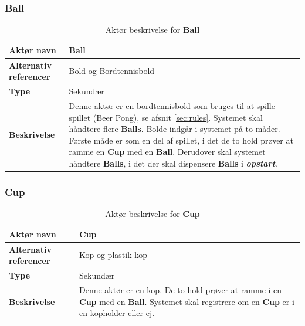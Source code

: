 \documentclass[Kravspecifikation/Kravspec_Main.tex]{subfiles}
\begin{document}
\subsubsection{Ball}
\begin{table}[H]
    \centering
    \begin{tabular}{|L{0.35\textwidth}|L{0.65\textwidth}|}
        \hline
        \textbf{Aktør navn} & Ball \\ \hline
        \textbf{Alternativ referencer} & Bold og Bordtennisbold \\ \hline
        \textbf{Type} & Sekundær \\ \hline
        \textbf{Beskrivelse} & Denne aktør er en bordtennisbold som bruges til at spille spillet (Beer Pong), se afsnit \ref{sec:rules}. Systemet skal håndtere flere \textbf{Balls}. Bolde indgår i systemet på to måder. Første måde er som en del af spillet, i det de to hold prøver at ramme en \textbf{Cup} med en \textbf{Ball}. Derudover skal systemet håndtere \textbf{Balls}, i det der skal dispensere \textbf{Balls} i \textbf{\textit{opstart}}.\\ \hline
    \end{tabular}
    \caption{Aktør beskrivelse for \textbf{Ball}}
    \label{tab:BallBeskrivelse}
\end{table}

\subsubsection{Cup}
\begin{table}[H]
    \centering
    \begin{tabular}{|L{0.35\textwidth}|L{0.65\textwidth}|}
        \hline
        \textbf{Aktør navn} &  Cup\\ \hline
        \textbf{Alternativ referencer} &  Kop og plastik kop\\ \hline
        \textbf{Type} & Sekundær \\ \hline
        \textbf{Beskrivelse} & Denne aktør er en kop. De to hold prøver at ramme i en \textbf{Cup} med en \textbf{Ball}. Systemet skal registrere om en \textbf{Cup} er i en kopholder eller ej.  \\ \hline
    \end{tabular}
    \caption{Aktør beskrivelse for \textbf{Cup}}
    \label{tab:CupBeskrivelse}
\end{table}
\end{document}
